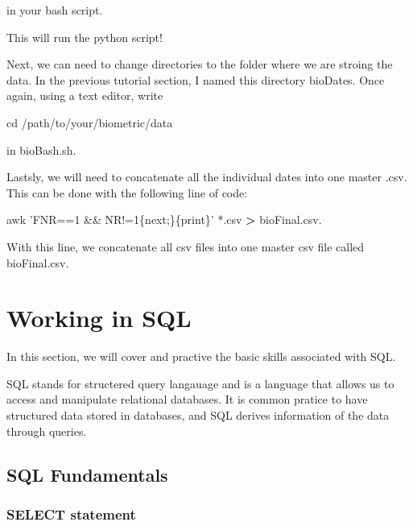 \documentclass[]{book}
\newenvironment{Shaded}{\begin{snugshade}}{\end{snugshade}}
\newcommand{\StringTok}[1]{\textcolor[rgb]{0.31,0.60,0.02}{#1}}
\newcommand{\FunctionTok}[1]{\textcolor[rgb]{0.00,0.00,0.00}{#1}}
\newcommand{\OperatorTok}[1]{\textcolor[rgb]{0.81,0.36,0.00}{\textbf{#1}}}
\newcommand{\BuiltInTok}[1]{#1}
\newcommand{\NormalTok}[1]{#1}
\begin{document}
in your bash script.

This will run the python script!

Next, we can need to change directories to the folder where we are
stroing the data. In the previous tutorial section, I named this
directory bioDates. Once again, using a text editor, write

\begin{Shaded}
\begin{Highlighting}[]
\BuiltInTok{cd}\NormalTok{ /path/to/your/biometric/data }
\end{Highlighting}
\end{Shaded}

in bioBash.sh.

Lastsly, we will need to concatenate all the individual dates into one
master .csv. This can be done with the following line of code:

\begin{Shaded}
\begin{Highlighting}[]
\FunctionTok{awk} \StringTok{'FNR==1 && NR!=1\{next;\}\{print\}'}\NormalTok{ *.csv }\OperatorTok{>}\NormalTok{ bioFinal.csv.}
\end{Highlighting}
\end{Shaded}

With this line, we concatenate all csv files into one master csv file
called bioFinal.csv.

\chapter{Working in SQL}\label{working-in-sql}

In this section, we will cover and practive the basic skills associated
with SQL.

SQL stands for structered query langauage and is a language that allows
us to access and manipulate relational databases. It is common pratice
to have structured data stored in databases, and SQL derives information
of the data through queries.

\section{SQL Fundamentals}\label{sql-fundamentals}

\subsection{SELECT statement}\label{select-statement}
\end{document}
